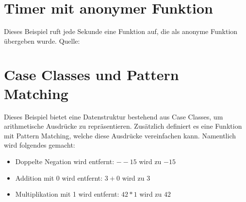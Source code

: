 \section{Timer mit anonymer Funktion}
\label{sec:bspAnonymous}

Dieses Beispiel ruft jede Sekunde eine Funktion auf, die als
anonyme Funktion übergeben wurde.
Quelle: \cite{scalaTutorial}



\section{Case Classes und Pattern Matching}
\label{sec:caseClasses}

Dieses Beispiel bietet eine Datenstruktur bestehend aus Case Classes, um
arithmetische Ausdrücke zu repräsentieren. Zusätzlich definiert es
eine Funktion mit Pattern Matching, welche diese Ausdrücke vereinfachen kann.
Namentlich wird folgendes gemacht:

\begin{itemize}
\item Doppelte Negation wird entfernt: $--15$ wird zu $-15$
\item Addition mit 0 wird entfernt: $3 + 0$ wird zu $3$
\item Multiplikation mit 1 wird entfernt: $42 * 1$ wird zu $42$
\end{itemize}


